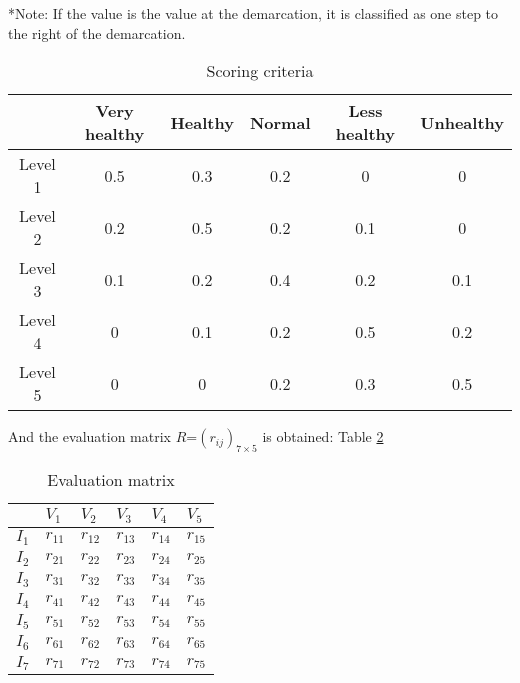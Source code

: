 \documentclass[12pt]{article}  %
\begin{document}
*Note: If the value is the value at the demarcation, it is classified as one step to the right of the demarcation.
\begin{table}[htbp]
	\caption{Scoring criteria}
	\begin{center}
	\begin{tabular}{|c|c|c|c|c|c|}
		\hline
		& Very healthy & Healthy & Normal & Less healthy & Unhealthy \\ \hline
		Level 1 & 0.5          & 0.3     & 0.2    & 0            & 0         \\ \hline
		Level 2 & 0.2          & 0.5     & 0.2    & 0.1          & 0         \\ \hline
		Level 3 & 0.1          & 0.2     & 0.4    & 0.2          & 0.1       \\ \hline
		Level 4 & 0            & 0.1     & 0.2    & 0.5          & 0.2       \\ \hline
		Level 5 & 0            & 0       & 0.2    & 0.3          & 0.5       \\ \hline
	\end{tabular}\label{tb:vvv}
	\end{center}
\end{table}

And the evaluation matrix $R$=$(r_{ij})_{7\times5}$ is obtained: Table \ref{tb:ppp}
 \begin{table}[htp]
	\begin{center}
		\caption{Evaluation matrix}		
	\begin{tabular}{l|lllll}
		\hline
		\multicolumn{1}{c|}{} & $V_1$ & $V_2$ & $V_3$ & $V_4$ & $V_5$ \\ \hline
		$I_1$                 & $r_{11}$ & $r_{12}$ & $r_{13}$ & $r_{14}$ & $r_{15}$ \\
		$I_2$                  & $r_{21}$ & $r_{22}$ & $r_{23}$ & $r_{24}$ & $r_{25}$ \\
		$I_3$                  & $r_{31}$ & $r_{32}$ & $r_{33}$ & $r_{34}$ & $r_{35}$ \\
		$I_4$                  & $r_{41}$ & $r_{42}$ & $r_{43}$ & $r_{44}$ & $r_{45}$ \\
		$I_5$                  & $r_{51}$ & $r_{52}$ & $r_{53}$ & $r_{54}$ & $r_{55}$ \\
		$I_6$                  & $r_{61}$ & $r_{62}$ & $r_{63}$ & $r_{64}$ & $r_{65}$ \\
		$I_7$                  & $r_{71}$ & $r_{72}$ & $r_{73}$ & $r_{74}$ & $r_{75}$ \\ \hline
	\end{tabular}\label{tb:ppp}
		\end{center}
\end{table}
\end{document}
